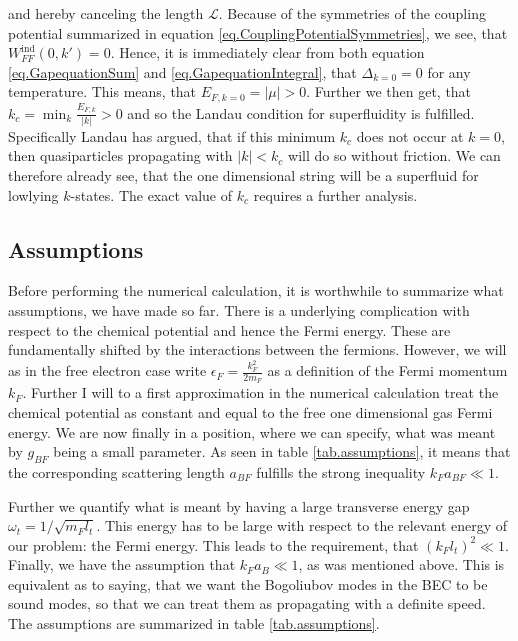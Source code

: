 and hereby canceling the length $\mathcal{L}$. Because of the symmetries of the coupling potential summarized in equation \eqref{eq.CouplingPotentialSymmetries}, we see, that $W^\text{ind}_{FF}(0,k') = 0$. Hence, it is immediately clear from both equation \eqref{eq.GapequationSum} and \eqref{eq.GapequationIntegral}, that $\Delta_{k=0} = 0$ for any temperature. This means, that $E_{F,k=0} = |\mu| > 0$. Further we then get, that $k_c = \min_k \frac{E_{F,k}}{|k|} > 0$ and so the Landau condition for superfluidity is fulfilled\cite{LandauStatPhys2,PlischkeStatPhys}.
Specifically Landau has argued, that if this minimum $k_c$ does not occur at $k=0$, then quasiparticles propagating with $|k|< k_c$ will do so without friction. We can therefore already see, that the one dimensional string will be a superfluid for lowlying $k$-states. The exact value of $k_c$ requires a further analysis. 

\subsection{Assumptions}
Before performing the numerical calculation, it is worthwhile to summarize what assumptions, we have made so far.  There is a underlying complication with respect to the chemical potential and hence the Fermi energy. These are fundamentally shifted by the interactions between the fermions. However, we will as in the free electron case write $\epsilon_F = \frac{k_F^2}{2m_F}$ as a definition of the Fermi momentum $k_F$. Further I will to a first approximation in the numerical calculation treat the chemical potential as constant and equal to the free one dimensional gas Fermi energy. We are now finally in a position, where we can specify, what was meant by $g_{BF}$ being a small parameter. As seen in table \ref{tab.assumptions}, it means that the corresponding scattering length $a_{BF}$ fulfills the strong inequality $k_F a_{BF} \ll 1$. 

Further we quantify what is meant by having a large transverse energy gap $\omega_t = 1/\sqrt{m_Fl_t}$. This energy has to be large with respect to the relevant energy of our problem: the Fermi energy. This leads to the requirement, that $(k_Fl_t)^2\ll 1$. Finally, we have the assumption that $k_Fa_B \ll 1$, as was mentioned above. This is equivalent as to saying, that we want the Bogoliubov modes in the BEC to be sound modes, so that we can treat them as propagating with a definite speed. The assumptions are summarized in table \ref{tab.assumptions}.


